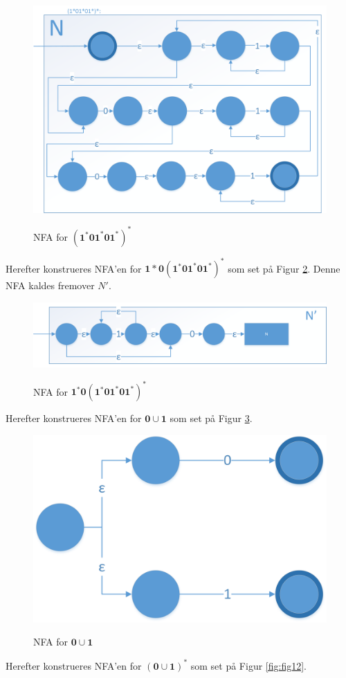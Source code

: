 \documentclass[a4paper,10pt,article]{memoir}
\begin{document}
\begin{eksempel}
\begin{figure}[H]%
{\centering 
\includegraphics[width=\textwidth]{Fig9x.png}
} \caption{NFA for $\mathbf{(1^*01^*01^*)^*}$}
\label{fig:fig9}
\end{figure}

Herefter konstrueres NFA'en for $\mathbf{1*0(1^*01^*01^*)^*}$ som set på Figur \ref{fig:fig10}. Denne NFA kaldes fremover $N'$.

\begin{figure}[H]%
{\centering 
\includegraphics[width=\textwidth]{Fig10x.png}
} \caption{NFA for $\mathbf{1^*0(1^*01^*01^*)^*}$}
\label{fig:fig10}
\end{figure}

Herefter konstrueres NFA'en for $\mathbf{0\cup 1}$ som set på Figur \ref{fig:fig11}.

\begin{figure}[H]%
{\centering 
\includegraphics[width=\textwidth]{Fig11x.png}
} \caption{NFA for $\mathbf{0\cup 1}$}
\label{fig:fig11}
\end{figure}
Herefter konstrueres NFA'en for $\mathbf{(0\cup 1)^*}$ som set på Figur \ref{fig:fig12}.


\end{eksempel}
\end{document}
